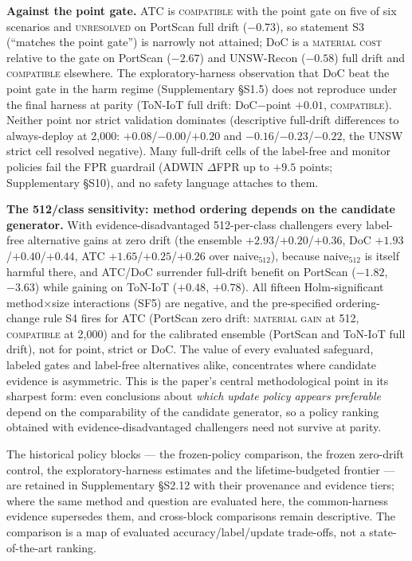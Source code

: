 \documentclass[a4paper,fleqn]{cas-sc}
\begin{document}
\textbf{Against the point gate.} ATC is \textsc{compatible} with the point gate on five of six scenarios and \textsc{unresolved} on PortScan full drift ($-0.73$), so statement S3 (``matches the point gate'') is narrowly not attained; DoC is a \textsc{material cost} relative to the gate on PortScan ($-2.67$) and UNSW-Recon ($-0.58$) full drift and \textsc{compatible} elsewhere. The exploratory-harness observation that DoC beat the point gate in the harm regime (Supplementary \S S1.5) does not reproduce under the final harness at parity (ToN-IoT full drift: DoC$-$point $+0.01$, \textsc{compatible}). Neither point nor strict validation dominates (descriptive full-drift differences to always-deploy at 2{,}000: $+0.08$/$-0.00$/$+0.20$ and $-0.16$/$-0.23$/$-0.22$, the UNSW strict cell resolved negative). Many full-drift cells of the label-free and monitor policies fail the FPR guardrail (ADWIN $\Delta$FPR up to $+9.5$ points; Supplementary \S S10), and no safety language attaches to them.

\textbf{The 512/class sensitivity: method ordering depends on the candidate generator.} With evidence-disadvantaged 512-per-class challengers every label-free alternative gains at zero drift (the ensemble $+2.93$/$+0.20$/$+0.36$, DoC $+1.93$/$+0.40$/$+0.44$, ATC $+1.65$/$+0.25$/$+0.26$ over naive$_{512}$), because naive$_{512}$ is itself harmful there, and ATC/DoC surrender full-drift benefit on PortScan ($-1.82$, $-3.63$) while gaining on ToN-IoT ($+0.48$, $+0.78$). All fifteen Holm-significant method$\times$size interactions (SF5) are negative, and the pre-specified ordering-change rule S4 fires for ATC (PortScan zero drift: \textsc{material gain} at 512, \textsc{compatible} at 2{,}000) and for the calibrated ensemble (PortScan and ToN-IoT full drift), not for point, strict or DoC. The value of every evaluated safeguard, labeled gates and label-free alternatives alike, concentrates where candidate evidence is asymmetric. This is the paper's central methodological point in its sharpest form: even conclusions about \emph{which update policy appears preferable} depend on the comparability of the candidate generator, so a policy ranking obtained with evidence-disadvantaged challengers need not survive at parity.

The historical policy blocks --- the frozen-policy comparison, the frozen zero-drift control, the exploratory-harness estimates and the lifetime-budgeted frontier --- are retained in Supplementary \S S2.12 with their provenance and evidence tiers; where the same method and question are evaluated here, the common-harness evidence supersedes them, and cross-block comparisons remain descriptive. The comparison is a map of evaluated accuracy/label/update trade-offs, not a state-of-the-art ranking.
\end{document}
